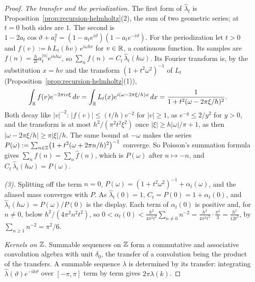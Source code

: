 \begin{proof}
\leanok
{}
\emph{The transfer and the periodization.} The first form of $\widehat\lambda_t$ is
Proposition~\ref{prop:recursion-helmholtz}(2), the sum of two geometric series; at $t = 0$ both
sides are $1$. The second is
$1 - 2a_t\cos\vartheta + a_t^2 = (1 - a_te^{i\vartheta})(1 - a_te^{-i\vartheta})$. For the
periodization let $t > 0$ and $f(v) := h\,L_t(hv)\,e^{i\omega hv}$ for $v \in \mathbb{R}$, a continuous
function. Its samples are $f(n) = \tfrac{h}{2t}a_t^{|n|}e^{inh\omega}$, so
$\sum_nf(n) = C_t\,\widehat\lambda_t(h\omega)$. Its Fourier transform is, by the substitution
$x = hv$ and the transform $(1 + t^2\omega^2)^{-1}$ of $L_t$
(Proposition~\ref{prop:recursion-helmholtz}(1)),
\[
  \int_{\mathbb{R}}f(v)e^{-2\pi iv\xi}\,dv = \int_{\mathbb{R}}L_t(x)e^{i(\omega - 2\pi\xi/h)x}\,dx
  = \frac{1}{1 + t^2(\omega - 2\pi\xi/h)^2} .
\]
Both decay like $|v|^{-2}$: $|f(v)| \le (t/h)v^{-2}$ for $|v| \ge 1$, as $e^{-y} \le 2/y^2$ for
$y > 0$, and the transform is at most $h^2/(\pi^2t^2\xi^2)$ once $|\xi| \ge h|\omega|/\pi + 1$, as
then $|\omega - 2\pi\xi/h| \ge \pi|\xi|/h$. The same bound at $-\omega$ makes the series
$P(\omega) := \sum_{n \in \mathbb{Z}}\bigl(1 + t^2(\omega + 2\pi n/h)^2\bigr)^{-1}$ converge. So Poisson's
summation formula gives $\sum_nf(n) = \sum_n\widehat f(n)$, which is $P(\omega)$ after
$n \mapsto -n$, and $C_t\,\widehat\lambda_t(h\omega) = P(\omega)$.

\emph{(3).} Splitting off the term $n = 0$, $P(\omega) = (1 + t^2\omega^2)^{-1} + \alpha_t(\omega)$,
and the aliased mass converges with $P$. As $\widehat\lambda_t(0) = 1$,
$C_t = P(0) = 1 + \alpha_t(0)$, and $\widehat\lambda_t(h\omega) = P(\omega)/P(0)$ is the display.
Each term of $\alpha_t(0)$ is positive and, for $n \ne 0$, below $h^2/(4\pi^2n^2t^2)$, so
$0 < \alpha_t(0) < \tfrac{h^2}{4\pi^2t^2}\sum_{n \ne 0}n^{-2} = \tfrac{h^2}{4\pi^2t^2}\cdot
\tfrac{\pi^2}{3} = \tfrac{h^2}{12t^2}$, by $\sum_{n \ge 1}n^{-2} = \pi^2/6$.

\emph{Kernels on $\mathbb{Z}$.} Summable sequences on $\mathbb{Z}$ form a commutative and associative convolution
algebra with unit $\delta_0$, the transfer of a convolution being the product of the transfers. A
summable sequence $\lambda$ is determined by its transfer: integrating
$\widehat\lambda(\vartheta)e^{-ik\vartheta}$ over $[-\pi,\pi]$ term by term gives $2\pi\lambda(k)$.


\end{proof}
